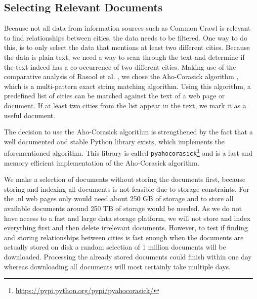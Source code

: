 \subsection{Selecting Relevant Documents}
Because not all data from information sources such as Common Crawl is relevant to find relationships between cities, the data needs to be filtered. One way to do this, is to only select the data that mentions at least two different cities. Because the data is plain text, we need a way to scan through the text and determine if the text indeed has a co-occurrence of two different cities.
Making use of the comparative analysis of Rasool et al. \cite{rasool2012string}, we chose the Aho-Corasick algorithm \cite{Aho-Corasick}, which is a multi-pattern exact string matching algorithm. Using this algorithm, a predefined list of cities can be matched against the text of a web page or document. If at least two cities from the list appear in the text, we mark it as a useful document.

The decision to use the Aho-Corasick algorithm is strengthened by the fact that a well documented and stable Python library exists, which implements the aforementioned algorithm. This library is called \texttt{pyahocorasick}\footnote{\url{https://pypi.python.org/pypi/pyahocorasick/}} and is a fast and memory efficient implementation of the Aho-Corasick algorithm.

We make a selection of documents without storing the documents first, because storing and indexing all documents is not feasible due to storage constraints. For the .nl web pages only would need about 250 GB of storage and to store all available documents around 250 TB of storage would be needed. As we do not have access to a fast and large data storage platform, we will not store and index everything first and then delete irrelevant documents. However, to test if finding and storing relationships between cities is fast enough when the documents are actually stored on disk a random selection of 1 million documents will be downloaded. Processing the already stored documents could finish within one day whereas downloading all documents will most certainly take multiple days.
